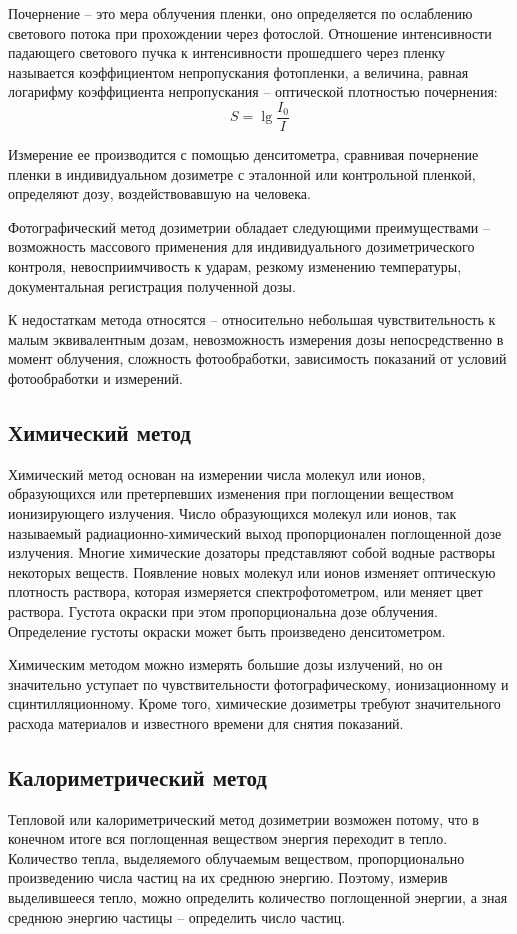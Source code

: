 \documentclass[14pt,pscyr,titlepage]{hedreport}
\begin{document}
		Почернение -- это мера облучения пленки, оно определяется по 
		ослаблению светового потока при прохождении через фотослой. Отношение 
		интенсивности падающего светового пучка к интенсивности прошедшего 
		через пленку называется  коэффициентом непропускания фотопленки, а 
		величина, равная логарифму коэффициента непропускания -- оптической 
		плотностью почернения:
		\[
			S = \lg\frac{I_0}{I}
		\]

		Измерение ее производится с помощью денситометра, сравнивая почернение 
		пленки в индивидуальном дозиметре с эталонной или контрольной 
		пленкой, определяют дозу, воздействовавшую на человека. 

		Фотографический метод дозиметрии обладает следующими 
		преимуществами -- возможность массового применения для индивидуального 
		дозиметрического контроля, невосприимчивость к ударам, резкому 
		изменению температуры, документальная регистрация полученной дозы.

		К недостаткам метода относятся -- относительно небольшая 
		чувствительность к малым эквивалентным дозам, невозможность измерения 
		дозы непосредственно в момент облучения, сложность фотообработки, 
		зависимость показаний от условий фотообработки и измерений.

	\subsection{Химический метод}
		Химический метод основан на измерении числа молекул или ионов, 
		образующихся или претерпевших изменения при поглощении веществом 
		ионизирующего излучения. Число образующихся молекул или ионов, так
		называемый радиационно-химический выход пропорционален поглощенной 
		дозе излучения. Многие химические дозаторы представляют собой водные 
		растворы некоторых веществ. Появление новых молекул или ионов изменяет 
		оптическую плотность раствора, которая измеряется  спектрофотометром, 
		или меняет цвет раствора. Густота окраски при этом пропорциональна 
		дозе облучения. Определение густоты окраски может быть произведено 
		денситометром.

		Химическим методом можно измерять большие дозы излучений, но он 
		значительно уступает по чувствительности фотографическому, 
		ионизационному и сцинтилляционному. Кроме того, химические дозиметры 
		требуют значительного расхода материалов и известного времени для 
		снятия показаний.

	\subsection{Калориметрический метод}
		Тепловой или калориметрический метод дозиметрии возможен потому, что в 
		конечном итоге вся поглощенная веществом энергия переходит в тепло. 
		Количество тепла, выделяемого облучаемым веществом, пропорционально 
		произведению числа частиц на их среднюю энергию. Поэтому, измерив 
		выделившееся тепло, можно определить количество поглощенной энергии, а 
		зная среднюю энергию частицы -- определить число частиц.      
\end{document}
